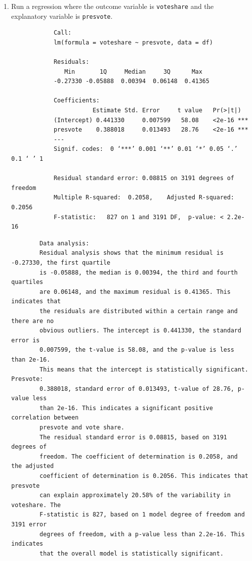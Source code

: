 \documentclass[12pt,letterpaper]{article}
\begin{document}
	\begin{enumerate}
		\item Run a regression where the outcome variable is \texttt{voteshare} and the explanatory variable is \texttt{presvote}.
		
		\begin{verbatim}
			Call:
			lm(formula = voteshare ~ presvote, data = df)
			
			Residuals:
			   Min       1Q     Median     3Q      Max 
			-0.27330 -0.05888  0.00394  0.06148  0.41365 
			
			Coefficients:
			           Estimate Std. Error     t value   Pr(>|t|)    
			(Intercept) 0.441330     0.007599   58.08    <2e-16 ***
			presvote    0.388018     0.013493   28.76    <2e-16 ***
			---
			Signif. codes:  0 ‘***’ 0.001 ‘**’ 0.01 ‘*’ 0.05 ‘.’ 0.1 ‘ ’ 1
			
			Residual standard error: 0.08815 on 3191 degrees of freedom
			Multiple R-squared:  0.2058,	Adjusted R-squared:  0.2056 
			F-statistic:   827 on 1 and 3191 DF,  p-value: < 2.2e-16
		\end{verbatim}
		\begin{verbatim}
		Data analysis:
		Residual analysis shows that the minimum residual is -0.27330, the first quartile 
		is -0.05888, the median is 0.00394, the third and fourth quartiles 
		are 0.06148, and the maximum residual is 0.41365. This indicates that 
		the residuals are distributed within a certain range and there are no 
		obvious outliers. The intercept is 0.441330, the standard error is 
		0.007599, the t-value is 58.08, and the p-value is less than 2e-16. 
		This means that the intercept is statistically significant. Presvote: 
		0.388018, standard error of 0.013493, t-value of 28.76, p-value less 
		than 2e-16. This indicates a significant positive correlation between 
		presvote and vote share.
		The residual standard error is 0.08815, based on 3191 degrees of 
		freedom. The coefficient of determination is 0.2058, and the adjusted 
		coefficient of determination is 0.2056. This indicates that presvote 
		can explain approximately 20.58% of the variability in voteshare. The 
		F-statistic is 827, based on 1 model degree of freedom and 3191 error 
		degrees of freedom, with a p-value less than 2.2e-16. This indicates 
		that the overall model is statistically significant.
		

\end{verbatim}
\end{enumerate}
\end{document}
